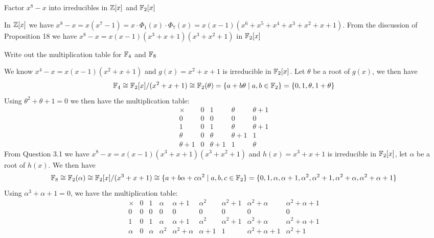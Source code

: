 \begin{exercise}
    Factor $x^8 - x$ into irreducibles in $\mathbb{Z}[x]$ and $\mathbb{F}_2[x]$
\end{exercise}
\begin{solution}
    In $\mathbb{Z}[x]$ we have $x^8 - x = x(x^7 - 1) = x\cdot \Phi_1(x)\cdot \Phi_7(x) = x(x-1)(x^6 + x^5 + x^4 + x^3 + x^2 + x + 1)$.
    From the discussion of Proposition 18 we have $x^8 - x = x(x-1)(x^3 + x + 1)(x^3 + x^2 + 1)$ in $\mathbb{F}_2[x]$
\end{solution}

\begin{exercise}
    Write out the multiplication table for $\F_4$ and $\F_8$
\end{exercise}
\begin{solution}
    We know $x^4 - x = x(x-1)(x^2 + x + 1)$ and $g(x) = x^2 + x + 1$ is irreducible in $\F_2[x]$. Let $\theta$ be a root of $g(x)$, we then have 
    \[\mathbb{F}_4 \cong \mathbb{F}_2[x]/(x^2 + x + 1) \cong \mathbb{F}_2(\theta) = \{a + b\theta \mid a, b \in \mathbb{F}_2\} = \{0, 1, \theta, 1 + \theta\}\] Using $\theta^2 + \theta + 1 = 0$ we then have the multiplication table: 
    $$\begin{array}{c|cccc}
    \times & 0 & 1 & \theta & \theta+1 \\ \hline 
    0 & 0 & 0 & 0 & 0 \\
    1 & 0 & 1 & \theta & \theta+1 \\
    \theta & 0 & \theta & \theta+1 & 1  \\
    \theta+1 & 0 & \theta+1 & 1 & \theta
    \end{array}
    $$
    From Question 3.1 we have $x^8 - x = x(x-1)(x^3 + x + 1)(x^3 + x^2 + 1)$ and $h(x) = x^3 + x + 1$ is irreducible in $\F_2[x]$, let $\alpha$ be a root of $h(x)$. We then have
    \[\mathbb{F}_8 \cong \mathbb{F}_2(\alpha) \cong \mathbb{F}_2[x]/(x^3 + x + 1) \cong \{a + b\alpha + c\alpha^2 \mid a,b,c \in \mathbb{F}_2\} = \{0, 1, \alpha, \alpha + 1, \alpha^2, \alpha^2 + 1, \alpha^2 + \alpha, \alpha^2 + \alpha + 1\}\]
    Using $\alpha^3 + \alpha + 1 = 0$, we have the multiplication table:
    $$\begin{array}{c|cccccccc}
    \times & 0 & 1 & \alpha & \alpha+1 & \alpha^2 & \alpha^2 + 1 & \alpha^2 + \alpha & \alpha^2 + \alpha + 1\\ \hline 
    0 & 0 & 0 & 0 & 0 & 0 & 0 & 0 & 0\\
    1 & 0 & 1 & \alpha & \alpha+1 & \alpha^2 & \alpha^2 + 1 & \alpha^2 + \alpha & \alpha^2 + \alpha + 1 \\
    \alpha & 0 & \alpha & \alpha^2 & \alpha^2 + \alpha & \alpha + 1 & 1 & \alpha^2 + \alpha + 1 & \alpha^2 + 1 \\

\end{array}$$
\end{solution}
